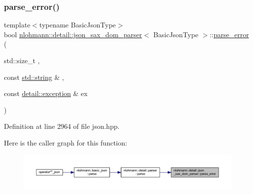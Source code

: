 \mbox{\label{classnlohmann_1_1detail_1_1json__sax__dom__parser_a7d3bf1f361ebb817c694ba45b3814fa6}} 
\subsubsection{\texorpdfstring{parse\_error()}{parse\_error()}}
{\footnotesize\ttfamily template$<$typename Basic\+Json\+Type$>$ \\
bool \mbox{\hyperlink{classnlohmann_1_1detail_1_1json__sax__dom__parser}{nlohmann\+::detail\+::json\+\_\+sax\+\_\+dom\+\_\+parser}}$<$ Basic\+Json\+Type $>$\+::\mbox{\hyperlink{classnlohmann_1_1detail_1_1parse__error}{parse\+\_\+error}} (\begin{DoxyParamCaption}\item[{std\+::size\+\_\+t}]{,  }\item[{const \mbox{\hyperlink{namespacenlohmann_1_1detail_a1ed8fc6239da25abcaf681d30ace4985ab45cffe084dd3d20d928bee85e7b0f21}{std\+::string}} \&}]{,  }\item[{const \mbox{\hyperlink{classnlohmann_1_1detail_1_1exception}{detail\+::exception}} \&}]{ex }\end{DoxyParamCaption})\hspace{0.3cm}{\ttfamily [inline]}}



Definition at line 2964 of file json.\+hpp.

Here is the caller graph for this function\+:
\nopagebreak
\begin{figure}[H]
\begin{center}
\leavevmode
\includegraphics[width=350pt]{classnlohmann_1_1detail_1_1json__sax__dom__parser_a7d3bf1f361ebb817c694ba45b3814fa6_icgraph}
\end{center}
\end{figure}
\mbox{\label{classnlohmann_1_1detail_1_1json__sax__dom__parser_a056b895d011efaf48ea096c024aca0d4}} 
